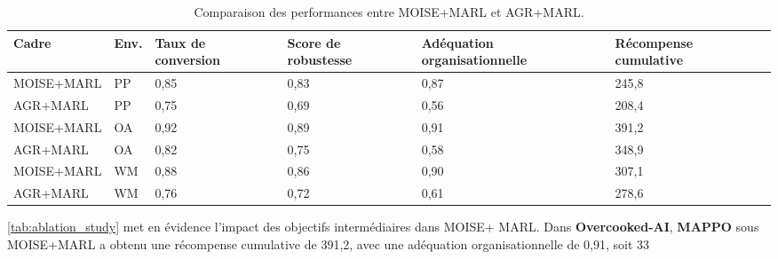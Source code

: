 \begin{table}[h!]
  \centering
  \caption{Comparaison des performances entre MOISE+MARL et AGR+MARL.}
  \label{tab:ablation_study}
  \small
  \renewcommand{\arraystretch}{1.1}
  {%

    \footnotesize

    \footnotesize

    \begin{tabular}{p{2cm}p{0.5cm}p{0.6cm}p{1.3cm}p{0.6cm}p{1.3cm}}
      \hline
      \textbf{Cadre} & \textbf{Env.} & \textbf{Taux de conversion} & \textbf{Score de robustesse} & \textbf{Adéquation organisationnelle} & \textbf{Récompense cumulative} \\ \hline
      MOISE+MARL     & PP            & 0,85                        & 0,83                         & 0,87                                  & 245,8                          \\
      AGR+MARL       & PP            & 0,75                        & 0,69                         & 0,56                                  & 208,4                          \\
      MOISE+MARL     & OA            & 0,92                        & 0,89                         & 0,91                                  & 391,2                          \\
      AGR+MARL       & OA            & 0,82                        & 0,75                         & 0,58                                  & 348,9                          \\
      MOISE+MARL     & WM            & 0,88                        & 0,86                         & 0,90                                  & 307,1                          \\
      AGR+MARL       & WM            & 0,76                        & 0,72                         & 0,61                                  & 278,6                          \\ \hline
    \end{tabular}
  }
\end{table}

\noindent \autoref{tab:ablation_study} met en évidence l'impact des objectifs intermédiaires dans MOISE+ MARL. Dans \textbf{Overcooked-AI}, \textbf{MAPPO} sous MOISE+MARL a obtenu une récompense cumulative de 391,2, avec une adéquation organisationnelle de 0,91, soit 33 %

